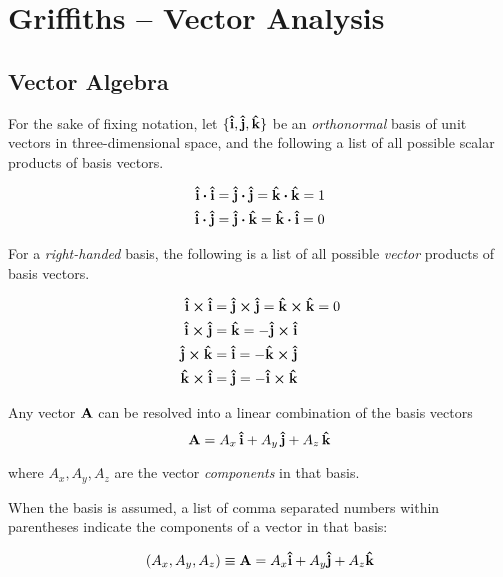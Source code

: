 \chapter{Griffiths -- Vector Analysis}
\label{ch:Griffiths_00} 

\section{Vector Algebra}
For the sake of fixing notation, let $\{\vu{i}, \vu{j}, \vu{k}\}$ be an \textit{orthonormal} basis of unit vectors in three-dimensional space, and the following a list of all possible scalar products of basis vectors. 
  
\begin{equation}
\begin{aligned} 
\vu{i}\vdot \vu{i} &= \vu{j} \vdot \vu{j} = \vu{k} \vdot \vu{k} = 1 \\ 
\vu{i} \vdot \vu{j} &= \vu{j} \vdot \vu{k} = \vu{k} \vdot \vu{i} = 0 
\label{eq:basis_dot_products}
\end{aligned}
\end{equation}

For a \textit{right-handed} basis, the following is a list of all possible \textit{vector} products of basis vectors.
  
\begin{equation}
\begin{aligned} 
\vu{i} \cross \vu{i} &= \vu{j} \cross \vu{j} = \vu{k} \cross \vu{k} = 0 \\ 
\vu{i} \cross \vu{j} &= \vu{k} = - \vu{j} \cross \vu{i}\\
\vu{j} \cross \vu{k} &= \vu{i} = - \vu{k} \cross \vu{j}\\
\vu{k} \cross \vu{i} &= \vu{j} = - \vu{i} \cross \vu{k}
\label{eq:basis_vector_products}
\end{aligned}
\end{equation}

Any vector $\vb{A}$ can be resolved into a linear combination of the basis vectors
\begin{equation*}
\vb{A} = A_x \, \vu{i} + A_y \, \vu{j} + A_z \, \vu{k} 
\end{equation*}

where $A_x, A_y, A_z$ are the vector \textit{components} in that basis. 

When the basis is assumed, a list of comma separated numbers within parentheses indicate the components of a vector in that basis: 

\begin{equation*}
(A_x, A_y, A_z) \equiv \vb{A} = A_x  \vu{i} + A_y  \vu{j} + A_z  \vu{k} 
\end{equation*}

